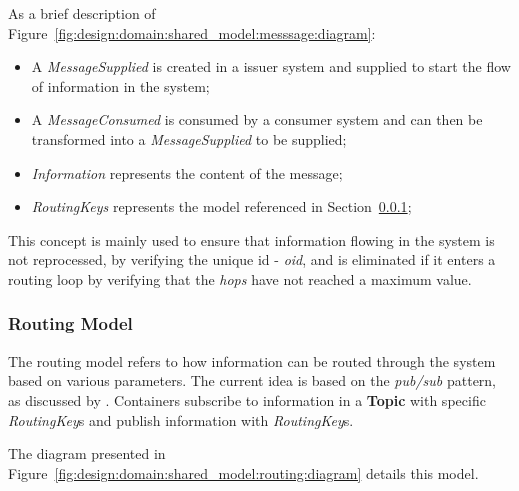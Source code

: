 As a brief description of Figure~\ref{fig:design:domain:shared_model:messsage:diagram}:

\begin{itemize}
   \item A \textit{MessageSupplied} is created in a issuer system and supplied to start the flow of information in the system;
   \item A \textit{MessageConsumed} is consumed by a consumer system and can then be transformed into a \textit{MessageSupplied} to be supplied;
   \item \textit{Information} represents the content of the message;
   \item \textit{RoutingKeys} represents the model referenced in Section~\ref{subsubsec:design:domain:shared_model:routing};
\end{itemize}

This concept is mainly used to ensure that information flowing in the system is not reprocessed, by verifying the unique id - \textit{oid}, and is eliminated if it enters a routing loop by verifying that the \textit{hops} have not reached a maximum value.

\subsubsection{Routing Model}
\label{subsubsec:design:domain:shared_model:routing}

The routing model refers to how information can be routed through the system based on various parameters. The current idea is based on the \textit{pub/sub} pattern, as discussed by \cite{urquhart2021flow}. Containers subscribe to information in a \textbf{Topic} with specific \textit{RoutingKey}s and publish information with \textit{RoutingKey}s.

The diagram presented in Figure~\ref{fig:design:domain:shared_model:routing:diagram} details this model.

